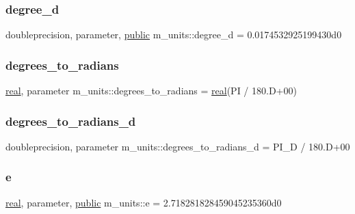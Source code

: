 \subsubsection{\texorpdfstring{degree\+\_\+d}{degree\_d}}
{\footnotesize\ttfamily doubleprecision, parameter, \hyperlink{M__stopwatch_83_8txt_a2f74811300c361e53b430611a7d1769f}{public} m\+\_\+units\+::degree\+\_\+d = 0.\+0174532925199430d0}

\mbox{\label{namespacem__units_a37687a78d45e4bcf4fa6b76ca11eb02b}} 
\subsubsection{\texorpdfstring{degrees\+\_\+to\+\_\+radians}{degrees\_to\_radians}}
{\footnotesize\ttfamily \hyperlink{read__watch_83_8txt_abdb62bde002f38ef75f810d3a905a823}{real}, parameter m\+\_\+units\+::degrees\+\_\+to\+\_\+radians = \hyperlink{read__watch_83_8txt_abdb62bde002f38ef75f810d3a905a823}{real}(PI / 180.\+D+00)\hspace{0.3cm}{\ttfamily [private]}}

\mbox{\label{namespacem__units_a74de2022908d613a91b83f9521460f6f}} 
\subsubsection{\texorpdfstring{degrees\+\_\+to\+\_\+radians\+\_\+d}{degrees\_to\_radians\_d}}
{\footnotesize\ttfamily doubleprecision, parameter m\+\_\+units\+::degrees\+\_\+to\+\_\+radians\+\_\+d = P\+I\+\_\+D / 180.\+D+00\hspace{0.3cm}{\ttfamily [private]}}

\mbox{\label{namespacem__units_a14ea25237dbdbd5c868d2729c67b2abd}} 
\subsubsection{\texorpdfstring{e}{e}}
{\footnotesize\ttfamily \hyperlink{read__watch_83_8txt_abdb62bde002f38ef75f810d3a905a823}{real}, parameter, \hyperlink{M__stopwatch_83_8txt_a2f74811300c361e53b430611a7d1769f}{public} m\+\_\+units\+::e = 2.\+718281828459045235360d0}

